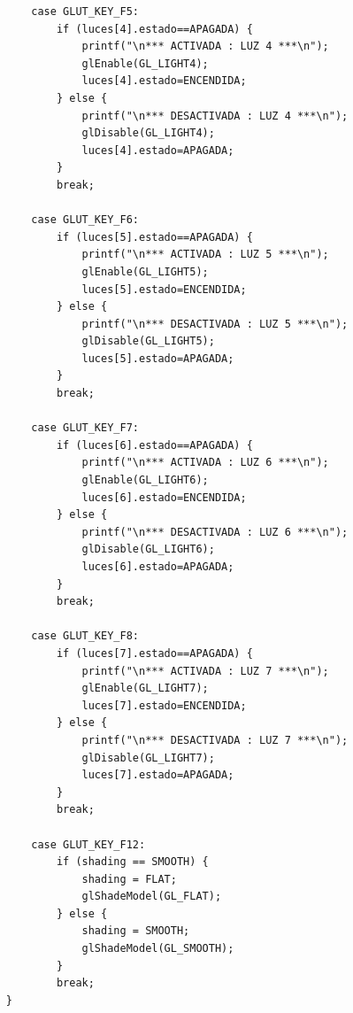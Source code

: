 \documentclass[12pt,a4paper]{article}
\begin{document}
\begin{lstlisting}
        case GLUT_KEY_F5:
            if (luces[4].estado==APAGADA) {
                printf("\n*** ACTIVADA : LUZ 4 ***\n");
                glEnable(GL_LIGHT4);
                luces[4].estado=ENCENDIDA;
            } else {
                printf("\n*** DESACTIVADA : LUZ 4 ***\n");
                glDisable(GL_LIGHT4);
                luces[4].estado=APAGADA;
            }
            break;
            
        case GLUT_KEY_F6:
            if (luces[5].estado==APAGADA) {
                printf("\n*** ACTIVADA : LUZ 5 ***\n");
                glEnable(GL_LIGHT5);
                luces[5].estado=ENCENDIDA;
            } else {
                printf("\n*** DESACTIVADA : LUZ 5 ***\n");
                glDisable(GL_LIGHT5);
                luces[5].estado=APAGADA;
            }
            break;
            
        case GLUT_KEY_F7:
            if (luces[6].estado==APAGADA) {
                printf("\n*** ACTIVADA : LUZ 6 ***\n");
                glEnable(GL_LIGHT6);
                luces[6].estado=ENCENDIDA;
            } else {
                printf("\n*** DESACTIVADA : LUZ 6 ***\n");
                glDisable(GL_LIGHT6);
                luces[6].estado=APAGADA;
            }
            break;
            
        case GLUT_KEY_F8:
            if (luces[7].estado==APAGADA) {
                printf("\n*** ACTIVADA : LUZ 7 ***\n");
                glEnable(GL_LIGHT7);
                luces[7].estado=ENCENDIDA;
            } else {
                printf("\n*** DESACTIVADA : LUZ 7 ***\n");
                glDisable(GL_LIGHT7);
                luces[7].estado=APAGADA;
            }
            break;
            
        case GLUT_KEY_F12:
            if (shading == SMOOTH) {
                shading = FLAT;
                glShadeModel(GL_FLAT);
            } else {
                shading = SMOOTH;
                glShadeModel(GL_SMOOTH);
            }
            break;
    }
    

\end{lstlisting}
\end{document}
